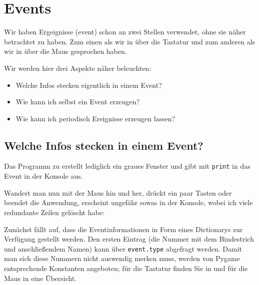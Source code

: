 \newpage
\section{Events}\label{secEvents}
Wir haben Ergeignisse (\gls{event}) schon an zwei Stellen verwendet, ohne sie näher betrachtet zu haben. Zum einen als wir in  über die Tastatur und zum anderen als wir in  über die Maus gesprochen haben. 

Wir werden hier drei Aspekte näher beleuchten: 

\begin{itemize}
    \item Welche Infos stecken eigentlich in einem Event?
    \item Wie kann ich selbst ein Event erzeugen?
    \item Wie kann ich periodisch Ereignisse erzeugen lassen?
\end{itemize}


\subsection{Welche Infos stecken in einem Event?}

Das Programm zu  erstellt lediglich ein graues Fenster und gibt mit \texttt{print} in  das Event in der Konsole aus.


Wandert man nun mit der Maus hin und her, drückt ein paar Tasten oder beendet die Anwendung, erscheint ungefähr sowas in der Konsole, wobei ich viele redundante Zeilen gelöscht habe:


Zunächst fällt auf, dass die Eventinformationen in Form eines Dictionarys zur Verfügung gestellt werden. Den ersten Eintrag (die Nummer mit dem Bindestrich und anschließendem Namen) kann über \texttt{event.type} abgefragt werden. Damit man sich diese Nummern nicht auswendig merken muss, werden von Pygame entsprechende Konstanten angeboten; für die Tastatur finden Sie in  und für die Maus in  eine Übersicht.

